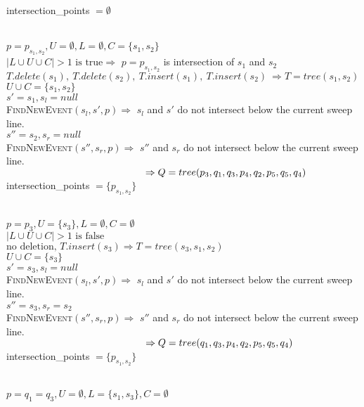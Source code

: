 \documentclass[english, fontsize=12pt, paper=a4, twoside=false, open=right, draft=true, pagesize=auto, version=last, DIV=16]{scrartcl}
\theoremstyle{break}
\begin{document}
intersection\_points $= \emptyset$ \par
\vspace*{-3mm}
\hrulefill \\
$p = p_{s_1,s_2}, U = \emptyset, L=\emptyset, C=\{s_1,s_2\}$ \\
$|L \cup U \cup C|>1 \text{ is true} \Rightarrow $ $p = p_{s_1,s_2}$ is intersection of $s_1$ and $s_2$ \\
$T.delete(s_1), \ T.delete(s_2), \ T.insert(s_1), \ T.insert(s_2) \ \Rightarrow T=tree(s_1,s_2)$ \\
$U \cup C=\{s_1, s_2\}$ \\
$s'=s_1, s_l=null$ \\ 
{\scshape{FindNewEvent}}$(s_l,s',p) \Rightarrow$ $s_l$ and $s'$ do not intersect below the current sweep line. \\
$s''=s_2, s_r=null$ \\ 
{\scshape{FindNewEvent}}$(s'',s_r,p) \Rightarrow$ $s''$ and $s_r$ do not intersect below the current sweep line. \\
$\hspace*{49.5mm} \Rightarrow Q=tree(p_3,q_1,q_3,p_4,q_2,p_5,q_5,q_4)$ \\
intersection\_points $= \{p_{s_1,s_2}\}$ \par
\vspace*{-3mm}
\hrulefill \\
\newpage
$p = p_3, U = \{s_3\}, L=\emptyset, C=\emptyset$ \\
$|L \cup U \cup C|>1 \text{ is false}$ \\
$\text{no deletion, }T.insert(s_3) \Rightarrow T=tree(s_3,s_1,s_2)$ \\
$U \cup C=\{s_3\}$ \\
$s'=s_3, s_l=null$ \\ 
{\scshape{FindNewEvent}}$(s_l,s',p) \Rightarrow$ $s_l$ and $s'$ do not intersect below the current sweep line. \\
$s''=s_3, s_r=s_2$ \\ 
{\scshape{FindNewEvent}}$(s'',s_r,p) \Rightarrow$ $s''$ and $s_r$ do not intersect below the current sweep line. \\
$\hspace*{49.5mm} \Rightarrow Q=tree(q_1,q_3,p_4,q_2,p_5,q_5,q_4)$ \\
intersection\_points $= \{p_{s_1,s_2}\}$ \par
\vspace*{-3mm}
\hrulefill \\
$p = q_1=q_3, U = \emptyset, L=\{s_1,s_3\}, C=\emptyset$ \\
\end{document}
